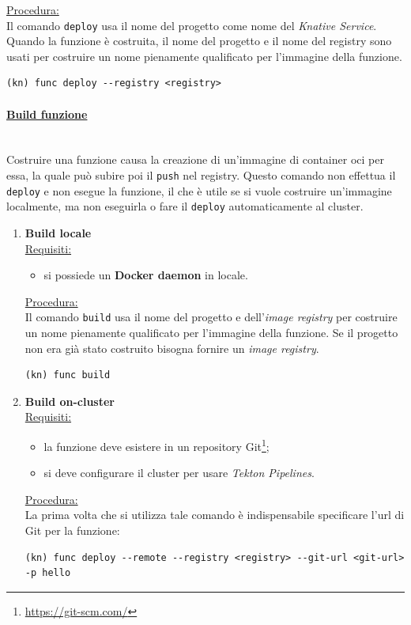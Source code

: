 \documentclass[12pt,a4paper,openany,twoside]{book}
\begin{document}
\noindent
\underline{Procedura:}
\\
Il comando \texttt{deploy} usa il nome del progetto come nome del \textit{Knative Service}. Quando la funzione è costruita, il nome del progetto e il nome del registry sono usati per costruire un nome pienamente qualificato per l'immagine della funzione.
\begin{lstlisting}
(kn) func deploy --registry <registry>\end{lstlisting}


\paragraph{\underline{Build funzione}} ~\\
Costruire una funzione causa la creazione di un'immagine di container \ac{oci} per essa, la quale può subire poi il \texttt{push} nel registry. Questo comando non effettua il \texttt{deploy} e non esegue la funzione, il che è utile se si vuole costruire un'immagine localmente, ma non eseguirla o fare il \texttt{deploy} automaticamente al cluster.

\begin{enumerate}
    \item \textbf{Build locale}
        \\
        \underline{Requisiti:}
        \begin{itemize}
            \item si possiede un \textbf{Docker daemon} in locale.
        \end{itemize}

        \underline{Procedura:}
        \\
        Il comando \texttt{build} usa il nome del progetto e dell'\textit{image registry} per costruire un nome pienamente qualificato per l'immagine della funzione. Se il progetto non era già stato costruito bisogna fornire un \textit{image registry}.
        \begin{lstlisting}
(kn) func build\end{lstlisting}

    \item \textbf{Build on-cluster}
    \\
    \underline{Requisiti:}
        \begin{itemize}
            \item la funzione deve esistere in un repository Git\footnote{\url{https://git-scm.com/}};
            
            \item si deve configurare il cluster per usare \textit{Tekton Pipelines}.
        \end{itemize}

        \underline{Procedura:}
        \\
        La prima volta che si utilizza tale comando è indispensabile specificare l'\ac{url} di Git per la funzione:
        \begin{lstlisting}
(kn) func deploy --remote --registry <registry> --git-url <git-url> -p hello\end{lstlisting}
\end{enumerate}
\end{document}
